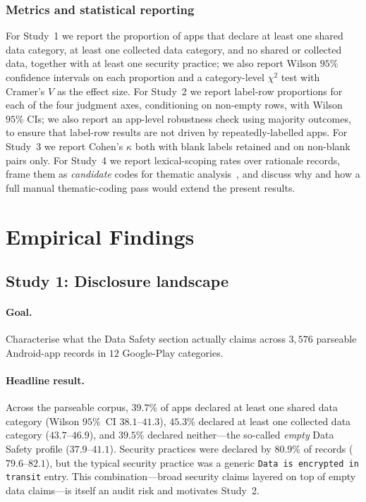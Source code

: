\documentclass[11pt,a4paper]{article}
\begin{document}
\subsubsection{Metrics and statistical reporting}
For Study~1 we report the proportion of apps that declare at least one
shared data category, at least one collected data category, and no
shared or collected data, together with at least one security practice;
we also report Wilson $95\%$ confidence intervals on each proportion and
a category-level $\chi^{2}$ test with Cramer's $V$ as the effect size.
For Study~2 we report label-row proportions for each of the four
judgment axes, conditioning on non-empty rows, with Wilson $95\%$ CIs;
we also report an app-level robustness check using majority outcomes,
to ensure that label-row results are not driven by repeatedly-labelled
apps. For Study~3 we report Cohen's $\kappa$
\citep{cohen1960coefficient,landis1977measurement}
both with blank labels retained and on non-blank pairs only. For Study~4
we report lexical-scoping rates over rationale records, frame them as
\emph{candidate} codes for thematic analysis~\citep{braun2006using}, and
discuss why and how a full manual thematic-coding pass would extend the
present results.

\section{Empirical Findings}
\label{sec:findings}
\subsection{Study 1: Disclosure landscape}
\label{sec:study1}
\paragraph{Goal.} Characterise what the Data Safety section actually
claims across $3{,}576$ parseable Android-app records in $12$ Google-Play
categories.

\paragraph{Headline result.}
Across the parseable corpus, $39.7\%$ of apps declared at least one
shared data category (Wilson $95\%$~CI $38.1\text{--}41.3$), $45.3\%$
declared at least one collected data category ($43.7\text{--}46.9$),
and $39.5\%$ declared neither---the so-called \emph{empty} Data Safety
profile ($37.9\text{--}41.1$). Security practices were declared by
$80.9\%$ of records ($79.6\text{--}82.1$), but the typical security
practice was a generic \texttt{Data is encrypted in transit} entry. This
combination---broad security claims layered on top of empty data
claims---is itself an audit risk and motivates Study~2.
\end{document}
